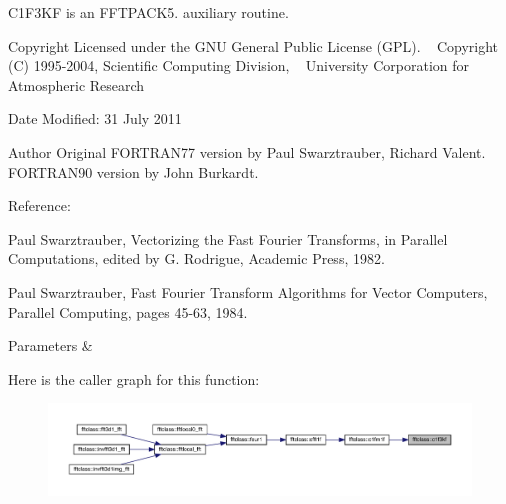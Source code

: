 C1\+F3\+KF is an F\+F\+T\+P\+A\+C\+K5. auxiliary routine. 

\begin{DoxyCopyright}{Copyright}
Licensed under the G\+NU General Public License (G\+PL). ~\newline
 Copyright (C) 1995-\/2004, Scientific Computing Division, ~\newline
 University Corporation for Atmospheric Research 
\end{DoxyCopyright}
\begin{DoxyDate}{Date}
Modified\+: 31 July 2011 
\end{DoxyDate}
\begin{DoxyAuthor}{Author}
Original F\+O\+R\+T\+R\+A\+N77 version by Paul Swarztrauber, Richard Valent. ~\newline
 F\+O\+R\+T\+R\+A\+N90 version by John Burkardt.
\end{DoxyAuthor}
\begin{DoxyVerb}  Reference:

    Paul Swarztrauber,
    Vectorizing the Fast Fourier Transforms,
    in Parallel Computations,
    edited by G. Rodrigue,
    Academic Press, 1982.

    Paul Swarztrauber,
    Fast Fourier Transform Algorithms for Vector Computers,
    Parallel Computing, pages 45-63, 1984.\end{DoxyVerb}
 
\begin{DoxyParams}{Parameters}
{\em } & \\
\hline
\end{DoxyParams}
Here is the caller graph for this function\+:\nopagebreak
\begin{figure}[H]
\begin{center}
\leavevmode
\includegraphics[width=350pt]{namespacefftclass_ae586c2f39848274e0454c7d161522c31_icgraph}
\end{center}
\end{figure}
\mbox{\label{namespacefftclass_a16b67c4056cd4bef03d70d6289f60954}} 
